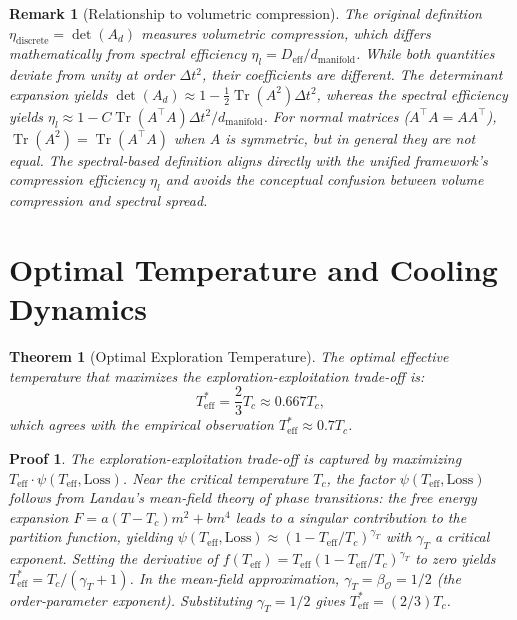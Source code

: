 \documentclass[11pt, a4paper]{article}
\newtheorem{theo}{Theorem}[section]
\theoremstyle{plain}
\newtheorem*{remark}{Remark}
\newtheorem*{pf}{Proof}
\DeclareMathOperator{\Tr}{Tr}
\begin{document}
\begin{remark}[Relationship to volumetric compression]
The original definition $\eta_{\text{discrete}} = \det(A_d)$ measures volumetric compression, which differs mathematically from spectral efficiency $\eta_l = D_{\text{eff}}/d_{\text{manifold}}$. While both quantities deviate from unity at order $\Delta t^2$, their coefficients are different. The determinant expansion yields $\det(A_d) \approx 1 - \frac{1}{2}\Tr(A^2)\Delta t^2$, whereas the spectral efficiency yields $\eta_l \approx 1 - C \Tr(A^\top A)\Delta t^2 / d_{\text{manifold}}$. For normal matrices ($A^\top A = AA^\top$), $\Tr(A^2) = \Tr(A^\top A)$ when $A$ is symmetric, but in general they are not equal. The spectral‑based definition aligns directly with the unified framework's compression efficiency $\eta_l$ and avoids the conceptual confusion between volume compression and spectral spread.
\end{remark}



\section{Optimal Temperature and Cooling Dynamics}

\begin{theo}[Optimal Exploration Temperature]\label{theo:optimal_temp}
The optimal effective temperature that maximizes the exploration-exploitation trade-off is:
\begin{equation}
T_{\text{eff}}^* = \frac{2}{3} T_c \approx 0.667 T_c,
\end{equation}
which agrees with the empirical observation $T_{\text{eff}}^* \approx 0.7 T_c$.
\end{theo}
\begin{pf}
The exploration-exploitation trade-off is captured by maximizing $T_{\text{eff}} \cdot \psi(T_{\text{eff}}, \text{Loss})$. Near the critical temperature $T_c$, the factor $\psi(T_{\text{eff}}, \text{Loss})$ follows from Landau's mean-field theory of phase transitions: the free energy expansion $F = a(T-T_c)m^2 + b m^4$ leads to a singular contribution to the partition function, yielding $\psi(T_{\text{eff}}, \text{Loss}) \approx (1 - T_{\text{eff}}/T_c)^{\gamma_T}$ with $\gamma_T$ a critical exponent. Setting the derivative of $f(T_{\text{eff}}) = T_{\text{eff}} (1 - T_{\text{eff}}/T_c)^{\gamma_T}$ to zero yields $T_{\text{eff}}^* = T_c / (\gamma_T + 1)$. In the mean-field approximation, $\gamma_T = \beta_{\mathcal{O}} = 1/2$ (the order‑parameter exponent). Substituting $\gamma_T = 1/2$ gives $T_{\text{eff}}^* = (2/3) T_c$.
\end{pf}
\end{document}
